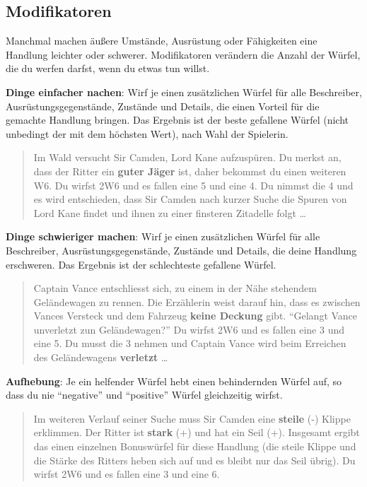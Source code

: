 \documentclass[]{article}
\begin{document}
\subsection{Modifikatoren}\label{modifikatoren}

Manchmal machen äußere Umstände, Ausrüstung oder Fähigkeiten eine
Handlung leichter oder schwerer. Modifikatoren verändern die Anzahl der
Würfel, die du werfen darfst, wenn du etwas tun willst.

\textbf{Dinge einfacher nachen}: Wirf je einen zusätzlichen Würfel für
alle Beschreiber, Ausrüstungsgegenstände, Zustände und Details, die
einen Vorteil für die gemachte Handlung bringen. Das Ergebnis ist der
beste gefallene Würfel (nicht unbedingt der mit dem höchsten Wert), nach
Wahl der Spielerin.

\begin{quote}
Im Wald versucht Sir Camden, Lord Kane aufzuspüren. Du merkst an, dass
der Ritter ein \textbf{guter Jäger} ist, daher bekommst du einen
weiteren W6. Du wirfst 2W6 und es fallen eine 5 und eine 4. Du nimmst
die 4 und es wird entschieden, dass Sir Camden nach kurzer Suche die
Spuren von Lord Kane findet und ihnen zu einer finsteren Zitadelle folgt
\ldots{}
\end{quote}

\textbf{Dinge schwieriger machen}: Wirf je einen zusätzlichen Würfel für
alle Beschreiber, Ausrüstungsgegenstände, Zustände und Details, die
deine Handlung erschweren. Das Ergebnis ist der schlechteste gefallene
Würfel.

\begin{quote}
Captain Vance entschliesst sich, zu einem in der Nähe stehendem
Geländewagen zu rennen. Die Erzählerin weist darauf hin, dass es
zwischen Vances Versteck und dem Fahrzeug \textbf{keine Deckung} gibt.
``Gelangt Vance unverletzt zun Geländewagen?'' Du wirfst 2W6 und es
fallen eine 3 und eine 5. Du musst die 3 nehmen und Captain Vance wird
beim Erreichen des Geländewagens \textbf{verletzt} \ldots{}
\end{quote}

\textbf{Aufhebung}: Je ein helfender Würfel hebt einen behindernden
Würfel auf, so dass du nie ``negative'' und ``positive'' Würfel
gleichzeitig wirfst.

\begin{quote}
Im weiteren Verlauf seiner Suche muss Sir Camden eine \textbf{steile}
(-) Klippe erklimmen. Der Ritter ist \textbf{stark} (+) und hat ein Seil
(+). Insgesamt ergibt das einen einzelnen Bonuswürfel für diese Handlung
(die steile Klippe und die Stärke des Ritters heben sich auf und es
bleibt nur das Seil übrig). Du wirfst 2W6 und es fallen eine 3 und eine
6.
\end{quote}
\end{document}
